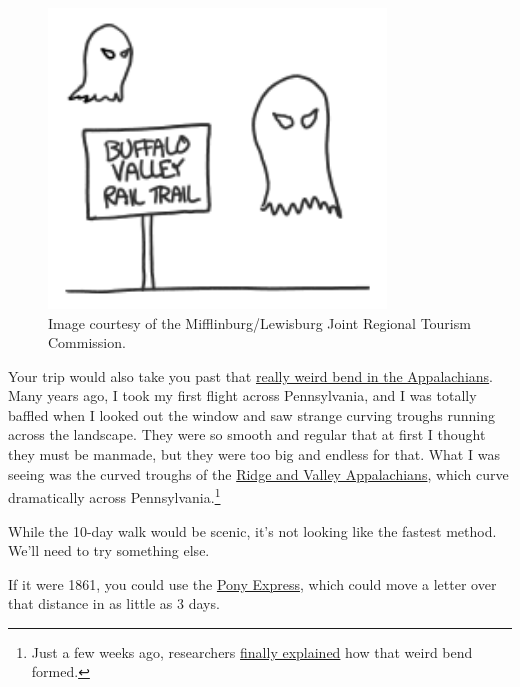 {\begin{figure}[!htbp]
\centering
\includegraphics[scale=0.5, max width=0.8\textwidth]{imgs/a/107/ghosts.png}
\caption{Image courtesy of the Mifflinburg/Lewisburg Joint Regional Tourism Commission.}
\end{figure}

{Your trip would also take you past that \href{https://www.google.com/maps/dir/Chicago,+IL/Hackensack,+NJ/@40.5625025,-77.4214882,128819m/data=!3m1!1e3!4m14!4m13!1m5!1m1!1s0x880e2c3cd0f4cbed:0xafe0a6ad09c0c000!2m2!1d-87.6297982!2d41.8781136!1m5!1m1!1s0x89c2fa1bb7efde49:0x420aad8868dd16d7!2m2!1d-74.0434736!2d40.8859325!3e2}{really weird bend in the Appalachians}. Many years ago, I took my first flight across Pennsylvania, and I was totally baffled when I looked out the window and saw strange curving troughs running across the landscape. They were so smooth and regular that at first I thought they must be manmade, but they were too big and endless for that. What I was seeing was the curved troughs of the \href{https://en.wikipedia.org/wiki/Ridge-and-Valley\_Appalachians}{Ridge and Valley Appalachians}, which curve dramatically across Pennsylvania.{\footnote{Just a few weeks ago, researchers \href{http://www.rochester.edu/newscenter/the-bend-in-the-appalachian-mountain-chain-is-finally-explained/}{finally explained} how that weird bend formed.} } }

{While the 10-day walk would be scenic, it's not looking like the fastest method. We'll need to try something else.}

{If it were 1861, you could use the \href{https://en.wikipedia.org/wiki/Pony\_Express}{Pony Express}, which could move a letter over that distance in as little as 3 days.}

}
